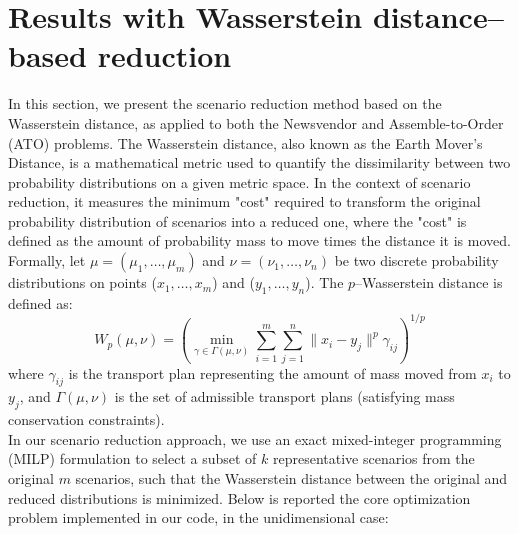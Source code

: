 \documentclass[a4paper,12pt]{article}
\begin{document}
	\newpage
	\section{Results with Wasserstein distance--based reduction}
	
	In this section, we present the scenario reduction method based on the Wasserstein distance, as applied to both the Newsvendor and Assemble-to-Order (ATO) problems. The Wasserstein distance, also known as the Earth Mover's Distance, is a mathematical metric used to quantify the dissimilarity between two probability distributions on a given metric space. In the context of scenario reduction, it measures the minimum "cost" required to transform the original probability distribution of scenarios into a reduced one, where the "cost" is defined as the amount of probability mass to move times the distance it is moved.\\	
	
	\noindent Formally, let $\mu = (\mu_1, \ldots, \mu_m)$ and $\nu = (\nu_1, \ldots, \nu_n)$ be two discrete probability distributions on points ($x_1, \ldots, x_m$) and ($y_1, \ldots, y_n$). The $p$--Wasserstein distance is defined as:
	\[
	W_p(\mu, \nu) = \left( \min_{\gamma \in \Gamma(\mu, \nu)} \sum_{i=1}^m \sum_{j=1}^n \|x_i - y_j\|^p \gamma_{ij} \right)^{1/p}
	\]
	where $\gamma_{ij}$ is the transport plan representing the amount of mass moved from $x_i$ to $y_j$, and $\Gamma(\mu, \nu)$ is the set of admissible transport plans (satisfying mass conservation constraints). \\
	
	\noindent In our scenario reduction approach, we use an exact mixed-integer programming (MILP) formulation to select a subset of $k$ representative scenarios from the original $m$ scenarios, such that the Wasserstein distance between the original and reduced distributions is minimized. Below is reported the core optimization problem implemented in our code, in the unidimensional case:
	
\end{document}

